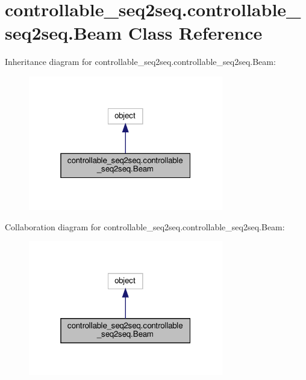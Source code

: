 \hypertarget{classcontrollable__seq2seq_1_1controllable__seq2seq_1_1Beam}{}\section{controllable\+\_\+seq2seq.\+controllable\+\_\+seq2seq.\+Beam Class Reference}
\label{classcontrollable__seq2seq_1_1controllable__seq2seq_1_1Beam}


Inheritance diagram for controllable\+\_\+seq2seq.\+controllable\+\_\+seq2seq.\+Beam\+:
\nopagebreak
\begin{figure}[H]
\begin{center}
\leavevmode
\includegraphics[width=241pt]{classcontrollable__seq2seq_1_1controllable__seq2seq_1_1Beam__inherit__graph}
\end{center}
\end{figure}


Collaboration diagram for controllable\+\_\+seq2seq.\+controllable\+\_\+seq2seq.\+Beam\+:
\nopagebreak
\begin{figure}[H]
\begin{center}
\leavevmode
\includegraphics[width=241pt]{classcontrollable__seq2seq_1_1controllable__seq2seq_1_1Beam__coll__graph}
\end{center}
\end{figure}
